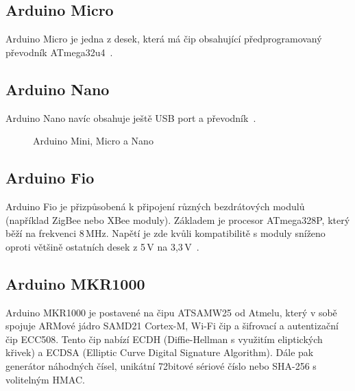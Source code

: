 	\subsection{Arduino Micro} 
	Arduino Micro je jedna z desek, která má čip obsahující předprogramovaný převodník ATmega32u4~\cite{ArduinoMicro}.	 
		
	\subsection{Arduino Nano} 
	Arduino Nano navíc obsahuje ještě USB port a převodník~\cite{ArduinoNano}.	
		
\begin{figure}[!ht]
    \centering
			\hspace*{5mm}
			\hspace*{5mm}
		\caption{Arduino Mini, Micro a Nano}
\end{figure}
	
		
		\subsection{Arduino Fio} 
		Arduino Fio je přizpůsobená k připojení různých bezdrátových modulů (například ZigBee nebo XBee moduly). Základem je procesor ATmega328P, který běží na frekvenci 8\,MHz. Napětí je zde kvůli kompatibilitě s moduly sníženo oproti většině ostatních desek z 5\,V na 3,3\,V~\cite{ArduinoFio}.	
		
	\subsection{Arduino MKR1000}
	Arduino MKR1000 je postavené na čipu ATSAMW25 od Atmelu, který v sobě spojuje ARMové jádro SAMD21 Cortex-M, Wi-Fi čip a šifrovací a autentizační čip ECC508. Tento čip nabízí ECDH (Diffie-Hellman s využitím eliptických křivek) a ECDSA (Elliptic Curve Digital Signature Algorithm). Dále pak generátor náhodných čísel, unikátní 72bitové sériové číslo nebo SHA-256 s volitelným HMAC.
	
